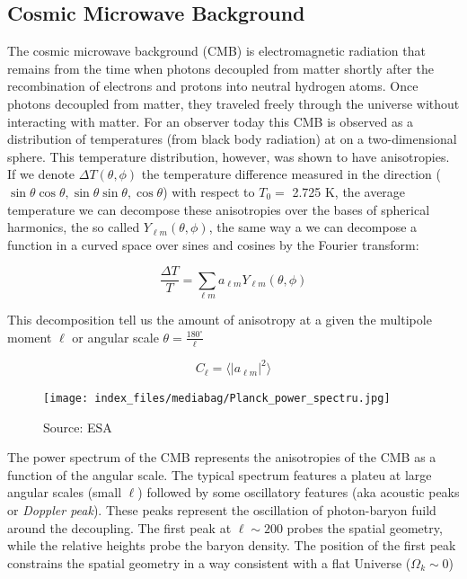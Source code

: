 \documentclass[
  letterpaper,
  DIV=11,
  numbers=noendperiod]{scrreprt}
\begin{document}
\subsection{Cosmic Microwave
Background}\label{cosmic-microwave-background}

The cosmic microwave background (CMB) is electromagnetic radiation that
remains from the time when photons decoupled from matter shortly after
the recombination of electrons and protons into neutral hydrogen atoms.
Once photons decoupled from matter, they traveled freely through the
universe without interacting with matter. For an observer today this CMB
is observed as a distribution of temperatures (from black body
radiation) at on a two-dimensional sphere. This temperature
distribution, however, was shown to have anisotropies. If we denote
\(\Delta T (\theta, \phi)\) the temperature difference measured in the
direction
(\(\sin\theta \cos \theta, \sin\theta \sin\theta , \cos\theta\)) with
respect to \(T_0 =\) 2.725 K, the average temperature we can decompose
these anisotropies over the bases of spherical harmonics, the so called
\(Y_{\ell m} (\theta, \phi)\), the same way a we can decompose a
function in a curved space over sines and cosines by the Fourier
transform:

\[\frac{\Delta T}{T} = \sum_{\ell m} a_{\ell m} Y_{\ell m} (\theta, \phi)\]

This decomposition tell us the amount of anisotropy at a given the
multipole moment \(\ell\) or angular scale
\(\theta = \frac{180^{\circ}}{\ell}\)

\[C_\ell = \langle |a_{\ell m}|^2 \rangle\]

\begin{figure}[H]

{\centering \texttt{[image: index\_files/mediabag/Planck\_power\_spectru.jpg]}

}

\caption{Source: ESA}

\end{figure}%

The power spectrum of the CMB represents the anisotropies of the CMB as
a function of the angular scale. The typical spectrum features a plateu
at large angular scales (small \(\ell\)) followed by some oscillatory
features (aka acoustic peaks or \emph{Doppler peak}). These peaks
represent the oscillation of photon-baryon fuild around the decoupling.
The first peak at \(\ell \sim 200\) probes the spatial geometry, while
the relative heights probe the baryon density. The position of the first
peak constrains the spatial geometry in a way consistent with a flat
Universe (\(\Omega_k \sim 0\))
\end{document}
